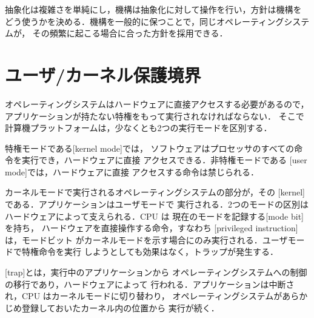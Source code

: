 \documentclass[../main.tex]{subfiles}
\begin{document}
\begin{keypoint}
  抽象化は複雑さを単純にし，機構は抽象化に対して操作を行い，方針は機構を
  どう使うかを決める．機構を一般的に保つことで，同じオペレーティングシステムが，
  その頻繁に起こる場合に合った方針を採用できる．
\end{keypoint}

\section{ユーザ/カーネル保護境界}
\label{sec:l01-boundary}

オペレーティングシステムはハードウェアに直接アクセスする必要があるので，
アプリケーションが持たない特権をもって実行されなければならない．
%
そこで計算機プラットフォームは，少なくとも2つの実行モードを区別する．

\begin{definition}[カーネルモードとユーザモード]
  特権モードである[kernel mode]では，
  ソフトウェアはプロセッサのすべての命令を実行でき，ハードウェアに直接
  アクセスできる．非特権モードである
  [user mode]では，ハードウェアに直接
  アクセスする命令は禁じられる．
\end{definition}

カーネルモードで実行されるオペレーティングシステムの部分が，その
[kernel]である．アプリケーションはユーザモードで
実行される．2つのモードの区別はハードウェアによって支えられる．CPU は
現在のモードを記録する[mode bit]を持ち，
ハードウェアを直接操作する命令，すなわち
[privileged instruction]は，モードビット
がカーネルモードを示す場合にのみ実行される．ユーザモードで特権命令を実行
しようとしても効果はなく，トラップが発生する．

\begin{definition}[トラップ]
  [trap]とは，実行中のアプリケーションから
  オペレーティングシステムへの制御の移行であり，ハードウェアによって
  行われる．アプリケーションは中断され，CPU はカーネルモードに切り替わり，
  オペレーティングシステムがあらかじめ登録しておいたカーネル内の位置から
  実行が続く．
\end{definition}
\end{document}
